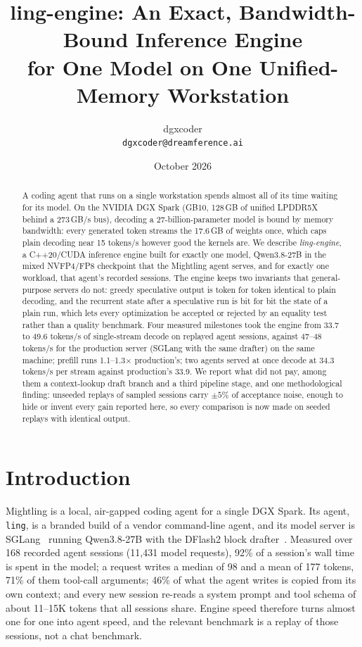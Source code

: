 \documentclass[11pt]{article}
\title{ling-engine: An Exact, Bandwidth-Bound Inference Engine\\for One Model on One Unified-Memory Workstation}
\author{dgxcoder\\ \texttt{dgxcoder@dreamference.ai}}
\date{October 2026}
\newcommand{\code}[1]{\texttt{#1}}
\begin{document}
\maketitle

\begin{abstract}
A coding agent that runs on a single workstation spends almost all of its time waiting for its model.
On the NVIDIA DGX Spark (GB10, 128\,GB of unified LPDDR5X behind a 273\,GB/s bus), decoding a 27-billion-parameter
model is bound by memory bandwidth: every generated token streams the 17.6\,GB of weights once, which caps plain decoding
near 15 tokens/s however good the kernels are. We describe \emph{ling-engine}, a C++20/CUDA inference engine built for
exactly one model, Qwen3.8-27B in the mixed NVFP4/FP8 checkpoint that the Mightling agent serves, and for exactly one
workload, that agent's recorded sessions. The engine keeps two invariants that general-purpose servers do not: greedy
speculative output is token for token identical to plain decoding, and the recurrent state after a speculative run is bit
for bit the state of a plain run, which lets every optimization be accepted or rejected by an equality test rather than a
quality benchmark. Four measured milestones took the engine from 33.7 to 49.6 tokens/s of single-stream decode on
replayed agent sessions, against 47--48 tokens/s for the production server (SGLang with the same drafter) on the same
machine; prefill runs 1.1--1.3$\times$ production's; two agents served at once decode at 34.3 tokens/s per stream against
production's 33.9. We report what did not pay, among them a context-lookup draft branch and a third pipeline stage, and
one methodological finding: unseeded replays of sampled sessions carry $\pm5\%$ of acceptance noise, enough to hide or
invent every gain reported here, so every comparison is now made on seeded replays with identical output.
\end{abstract}

\section{Introduction}

Mightling is a local, air-gapped coding agent for a single DGX Spark. Its agent, \code{ling}, is a branded build of a
vendor command-line agent, and its model server is SGLang~\cite{zheng2023sglang} running Qwen3.8-27B with the DFlash2 block
drafter~\cite{chen2026dflash,dflash2drafter}. Measured over 168 recorded agent sessions (11,431 model requests), 92\% of a
session's wall time is spent in the model; a request writes a median of 98 and a mean of 177 tokens, 71\% of them
tool-call arguments; 46\% of what the agent writes is copied from its own context; and every new session re-reads a
system prompt and tool schema of about 11--15K tokens that all sessions share. Engine speed therefore turns almost one for
one into agent speed, and the relevant benchmark is a replay of those sessions, not a chat benchmark.
\end{document}
